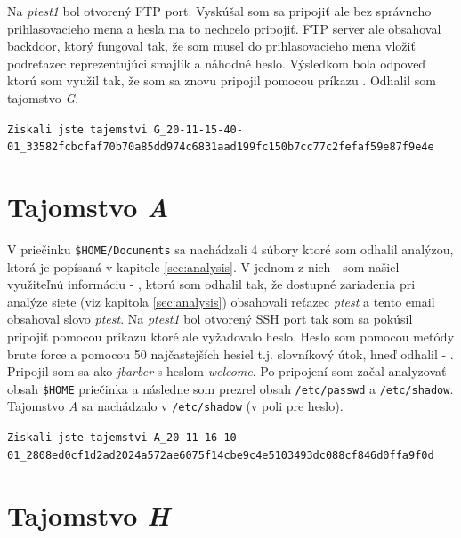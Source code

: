 \documentclass[11pt,a4paper]{article}
\begin{document}
Na \textit{ptest1} bol otvorený FTP port. Vyskúšal som sa pripojiť ale bez správneho prihlasovacieho mena a hesla ma to nechcelo pripojiť. FTP server ale obsahoval backdoor, ktorý fungoval tak, že som musel do prihlasovacieho mena vložiť podreťazec \uv{\textit{:)}} reprezentujúci smajlík a náhodné heslo. Výsledkom bola odpoveď  ktorú som využil tak, že som sa znovu pripojil pomocou príkazu . Odhalil som tajomstvo \textit{G}.

\begin{center}
\small{\texttt{Ziskali jste tajemstvi G\_20-11-15-40-01\_33582fcbcfaf70b70a85dd974c6831aad199fc150b7cc77c2fefaf59e87f9e4e}}
\end{center}

\section{Tajomstvo \textit{A}}\label{sec:A}

V priečinku \texttt{\$HOME/Documents} sa nachádzali 4 súbory ktoré som odhalil analýzou, ktorá je popísaná v kapitole \ref{sec:analysis}. V jednom z nich - \texttt{} som našiel využiteľnú informáciu - , ktorú som odhalil tak, že dostupné zariadenia pri analýze siete (viz kapitola \ref{sec:analysis}) obsahovali reťazec \textit{ptest} a tento email obsahoval slovo \textit{ptest}. Na \textit{ptest1} bol otvorený SSH port tak som sa pokúsil pripojiť pomocou príkazu  ktoré ale vyžadovalo heslo. Heslo som pomocou metódy brute force a pomocou 50 najčastejších hesiel t.j. slovníkový útok, hneď odhalil - . Pripojil som sa ako \textit{jbarber} s heslom \textit{welcome}. Po pripojení som začal analyzovať obsah \texttt{\$HOME} priečinka a následne som prezrel obsah \texttt{/etc/passwd} a \texttt{/etc/shadow}. Tajomstvo \textit{A} sa nachádzalo v \texttt{/etc/shadow} (v poli pre heslo).

\begin{center}
\small{\texttt{Ziskali jste tajemstvi A\_20-11-16-10-01\_2808ed0cf1d2ad2024a572ae6075f14cbe9c4e5103493dc088cf846d0ffa9f0d}}
\end{center}

\section{Tajomstvo \textit{H}}\label{sec:H}
\end{document}
